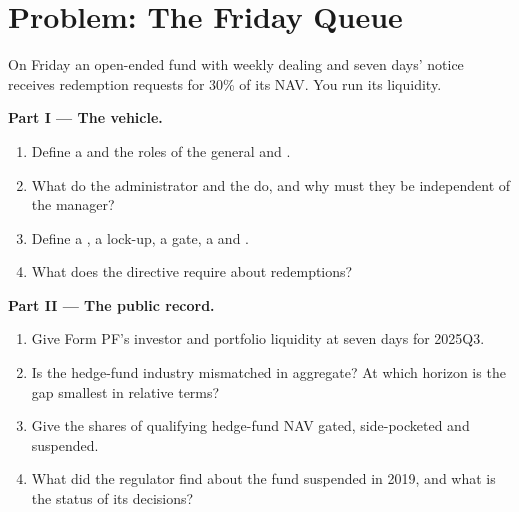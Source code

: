\section{Problem: The Friday Queue}

\begin{problem}\label{pb:fm:the-asset-manager-and-the-fund:1}
On Friday an open-ended fund with weekly dealing and seven days' notice receives redemption requests for 30\% of its NAV. You run its liquidity.

\medskip\noindent\textbf{Part I --- The vehicle.}
\begin{enumerate}
\item Define a  and the roles of the general and .
\item What do the administrator and the  do, and why must they be independent of the manager?
\item Define a , a lock-up, a gate, a  and .
\item What does the  directive require about redemptions?
\end{enumerate}

\medskip\noindent\textbf{Part II --- The public record.}
\begin{enumerate}[resume]
\item Give Form PF's investor and portfolio liquidity at seven days for 2025Q3.
\item Is the hedge-fund industry mismatched in aggregate? At which horizon is the gap smallest in relative terms?
\item Give the shares of qualifying hedge-fund NAV gated, side-pocketed and suspended.
\item What did the regulator find about the fund suspended in 2019, and what is the status of its decisions?
\end{enumerate}


\end{problem}
